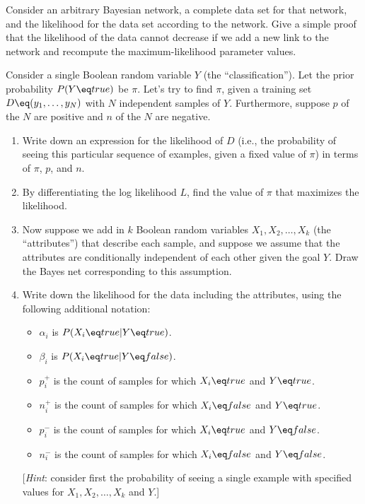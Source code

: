 \begin{exercise}
Consider an arbitrary Bayesian network, a complete data set for that network,
and the likelihood for the data set according to the network.
Give a simple proof that the likelihood of the data cannot decrease if we
add a new link to the network and recompute the maximum-likelihood parameter values.
\end{exercise} 

\begin{uexercise} %
Consider a single Boolean random variable $Y$ (the
``classification'').  Let the prior probability $P(Y\eq true)$ be $\pi$. 
Let's try to find $\pi$, given a training set $D\eq (y_1,\ldots,y_N)$ with
$N$ independent samples of $Y$.  Furthermore, suppose $p$ of the $N$
are positive and $n$ of the $N$ are negative.  
\begin{enumerate}
\item Write down an
expression for the likelihood of $D$ (i.e., the probability of seeing this particular sequence
of examples, given a fixed value of $\pi$) in terms of $\pi$, $p$, and $n$.
\item By differentiating the log likelihood $L$, find the value of $\pi$ that maximizes the likelihood.
\item Now suppose we add in $k$ Boolean random variables $X_1, X_2,\ldots,X_k$ (the ``attributes'')
that describe each sample, and 
suppose we assume that the 
attributes are conditionally independent of each other given the
goal $Y$. Draw the Bayes net corresponding to this assumption.

\item Write down the likelihood for the data including the attributes, using the following additional notation:
\begin{itemize}
\item $\alpha_i$ is $P(X_i\eq true | Y\eq true)$.
\item $\beta_i$ is $P(X_i\eq true | Y\eq false)$.
\item $p_i^+$ is the count of samples for which $X_i\eq true$ and $Y\eq true$.
\item $n_i^+$ is the count of samples for which $X_i\eq false$ and $Y\eq true$.
\item $p_i^-$ is the count of samples for which $X_i\eq true$ and $Y\eq false$.
\item $n_i^-$ is the count of samples for which $X_i\eq false$ and $Y\eq false$.
\end{itemize}
[{\em Hint}: consider first the probability of seeing a single example
with specified values for $X_1, X_2,\ldots,X_k$ and $Y$.]


\end{enumerate}
\end{uexercise}
